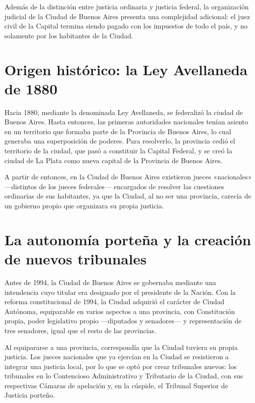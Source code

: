 \documentclass[12pt,oneside]{book}
\begin{document}
Además de la distinción entre justicia ordinaria y justicia federal, la organización judicial de la Ciudad de Buenos Aires presenta una complejidad adicional: el juez civil de la Capital termina siendo pagado con los impuestos de todo el país, y no solamente por los habitantes de la Ciudad.

\section{Origen histórico: la Ley Avellaneda de 1880}

\begin{note}
Hacia 1880, mediante la denominada Ley Avellaneda, se federalizó la ciudad de Buenos Aires. Hasta entonces, las primeras autoridades nacionales tenían asiento en un territorio que formaba parte de la Provincia de Buenos Aires, lo cual generaba una superposición de poderes. Para resolverlo, la provincia cedió el territorio de la ciudad, que pasó a constituir la Capital Federal, y se creó la ciudad de La Plata como nueva capital de la Provincia de Buenos Aires.
\end{note}

A partir de entonces, en la Ciudad de Buenos Aires existieron jueces «nacionales» —distintos de los jueces federales— encargados de resolver las cuestiones ordinarias de sus habitantes, ya que la Ciudad, al no ser una provincia, carecía de un gobierno propio que organizara su propia justicia.

\section{La autonomía porteña y la creación de nuevos tribunales}

Antes de 1994, la Ciudad de Buenos Aires se gobernaba mediante una intendencia cuyo titular era designado por el presidente de la Nación. Con la reforma constitucional de 1994, la Ciudad adquirió el carácter de Ciudad Autónoma, equiparable en varios aspectos a una provincia, con Constitución propia, poder legislativo propio —diputados y senadores— y representación de tres senadores, igual que el resto de las provincias.

Al equipararse a una provincia, correspondía que la Ciudad tuviera su propia justicia. Los jueces nacionales que ya ejercían en la Ciudad se resistieron a integrar una justicia local, por lo que se optó por crear tribunales nuevos: los tribunales en lo Contencioso Administrativo y Tributario de la Ciudad, con sus respectivas Cámaras de apelación y, en la cúspide, el Tribunal Superior de Justicia porteño.
\end{document}
